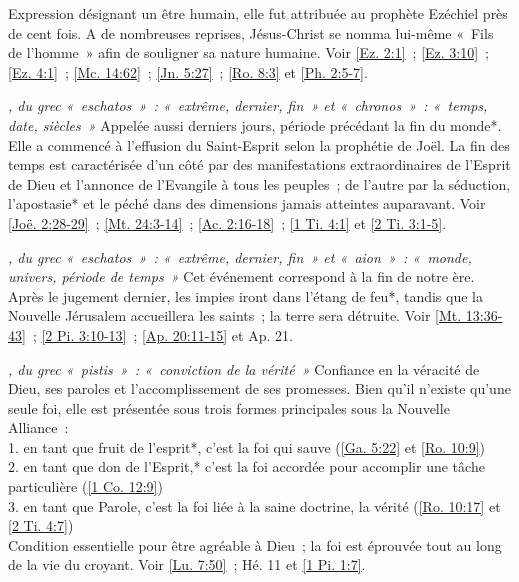 \begin{multicols}{2}
\textit{}\newline
Expression désignant un être humain, elle fut attribuée au prophète Ezéchiel près de cent fois. A de nombreuses reprises, Jésus-Christ se nomma lui-même «~Fils de l'homme~» afin de souligner sa nature humaine. Voir \vref{Ez. 2:1}~; \vref{Ez. 3:10}~; \vref{Ez. 4:1}~; \vref{Mc. 14:62}~; \vref{Jn. 5:27}~; \vref{Ro. 8:3} et \vref{Ph. 2:5-7}.

\textit{, du grec «~eschatos~»~: «~extrême, dernier, fin~» et «~chronos~»~: «~temps, date, siècles~»}\newline
Appelée aussi derniers jours, période précédant la fin du monde*. Elle a commencé à l'effusion du Saint-Esprit selon la prophétie de Joël. La fin des temps est caractérisée d'un côté par des manifestations extraordinaires de l'Esprit de Dieu et l'annonce de l'Evangile à tous les peuples~; de l'autre par la séduction, l'apostasie* et le péché dans des dimensions jamais atteintes auparavant. Voir \vref{Joë. 2:28-29}~; \vref{Mt. 24:3-14}~; \vref{Ac. 2:16-18}~; \vref{1 Ti. 4:1} et \vref{2 Ti. 3:1-5}.

\textit{, du grec «~eschatos~»~: «~extrême, dernier, fin~» et «~aion~»~: «~monde, univers, période de temps~»}\newline
Cet événement correspond à la fin de notre ère. Après le jugement dernier, les impies iront dans l'étang de feu*, tandis que la Nouvelle Jérusalem accueillera les saints~; la terre sera détruite. Voir \vref{Mt. 13:36-43}~; \vref{2 Pi. 3:10-13}~; \vref{Ap. 20:11-15} et Ap. 21.

\textit{, du grec «~pistis~»~: «~conviction de la vérité~»}\newline
Confiance en la véracité de Dieu, ses paroles et l'accomplissement de ses promesses. Bien qu'il n'existe qu'une seule foi, elle est présentée sous trois formes principales sous la Nouvelle Alliance~:
\\1. en tant que fruit de l'esprit*, c'est la foi qui sauve (\vref{Ga. 5:22} et \vref{Ro. 10:9})
\\2. en tant que don de l'Esprit,* c'est la foi accordée pour accomplir une tâche particulière (\vref{1 Co. 12:9})
\\3. en tant que Parole, c'est la foi liée à la saine doctrine, la vérité (\vref{Ro. 10:17} et \vref{2 Ti. 4:7})
\\Condition essentielle pour être agréable à Dieu~; la foi est éprouvée tout au long de la vie du croyant. Voir \vref{Lu. 7:50}~; Hé. 11 et \vref{1 Pi. 1:7}.


\end{multicols}

